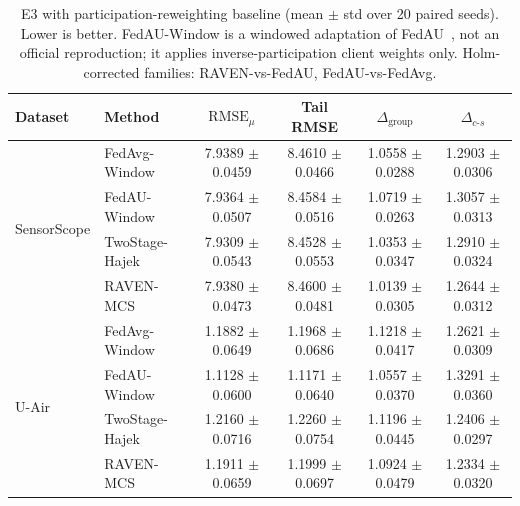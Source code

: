\begin{table}[t]
\centering
\caption{E3 with participation-reweighting baseline (mean $\pm$ std over 20
paired seeds). Lower is better. FedAU-Window is a windowed adaptation of
FedAU~\cite{wang2024lightweight}, not an official reproduction; it applies
inverse-participation client weights only. Holm-corrected families:
RAVEN-vs-FedAU, FedAU-vs-FedAvg.}
\label{tab:e3_fedau}
\setlength{\tabcolsep}{4.5pt}
\begin{tabular}{llcccc}
\toprule
Dataset & Method & $\mathrm{RMSE}_{\mu}$ & Tail RMSE &
$\Delta_{\mathrm{group}}$ & $\Delta_{c\text{-}s}$\\
\midrule
\multirow{4}{*}{SensorScope}
& FedAvg-Window    & 7.9389 $\pm$ 0.0459 & 8.4610 $\pm$ 0.0466 & 1.0558 $\pm$ 0.0288 & 1.2903 $\pm$ 0.0306\\
& FedAU-Window     & 7.9364 $\pm$ 0.0507 & 8.4584 $\pm$ 0.0516 & 1.0719 $\pm$ 0.0263 & 1.3057 $\pm$ 0.0313\\
& TwoStage-Hajek   & 7.9309 $\pm$ 0.0543 & 8.4528 $\pm$ 0.0553 & 1.0353 $\pm$ 0.0347 & 1.2910 $\pm$ 0.0324\\
& RAVEN-MCS        & 7.9380 $\pm$ 0.0473 & 8.4600 $\pm$ 0.0481 & 1.0139 $\pm$ 0.0305 & 1.2644 $\pm$ 0.0312\\
\midrule
\multirow{4}{*}{U-Air}
& FedAvg-Window    & 1.1882 $\pm$ 0.0649 & 1.1968 $\pm$ 0.0686 & 1.1218 $\pm$ 0.0417 & 1.2621 $\pm$ 0.0309\\
& FedAU-Window     & 1.1128 $\pm$ 0.0600 & 1.1171 $\pm$ 0.0640 & 1.0557 $\pm$ 0.0370 & 1.3291 $\pm$ 0.0360\\
& TwoStage-Hajek   & 1.2160 $\pm$ 0.0716 & 1.2260 $\pm$ 0.0754 & 1.1196 $\pm$ 0.0445 & 1.2406 $\pm$ 0.0297\\
& RAVEN-MCS        & 1.1911 $\pm$ 0.0659 & 1.1999 $\pm$ 0.0697 & 1.0924 $\pm$ 0.0479 & 1.2334 $\pm$ 0.0320\\
\bottomrule
\end{tabular}
\end{table}

